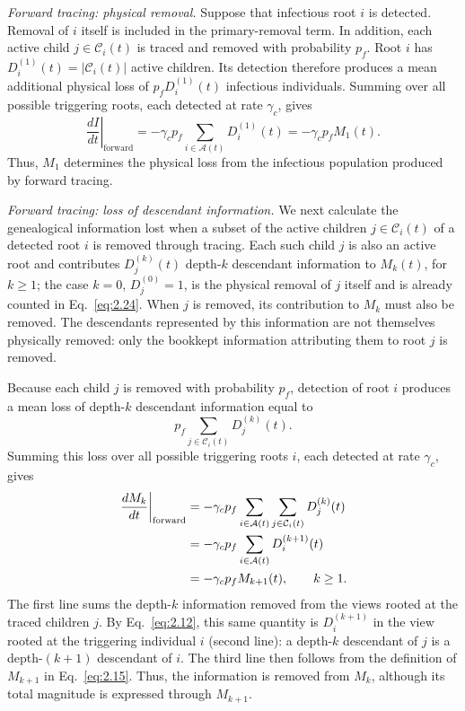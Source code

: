 \documentclass[review,12pt]{elsarticle}
\numberwithin{equation}{section}
\theoremstyle{remark}
\begin{document}
\textit{Forward tracing: physical removal.} Suppose that infectious root $i$ is detected. Removal of $i$ itself is included in the primary-removal term. In addition, each active child $j\in\mathcal C_i(t)$ is traced and removed with probability $p_f$. Root $i$ has $D_i^{(1)}(t)=|\mathcal C_i(t)|$ active children. Its detection therefore produces a mean additional physical loss of $p_f D_i^{(1)}(t)$ infectious individuals. Summing over all possible triggering roots, each detected at rate $\gamma_c$, gives
\begin{equation}
\left.\frac{dI}{dt}\right|_{\text{forward}} = -\gamma_c p_f \sum_{i\in\mathcal A(t)} D_i^{(1)}(t) = -\gamma_c p_f M_1(t).
\label{eq:2.24}
\end{equation}
Thus, $M_1$ determines the physical loss from the infectious population produced by forward tracing.

\textit{Forward tracing: loss of descendant information.} We next calculate the genealogical information lost when a subset of the active children $j\in\mathcal C_i(t)$ of a detected root $i$ is removed through tracing. Each such child $j$ is also an active root and contributes $D_j^{(k)}(t)$ depth-$k$ descendant information to $M_k(t)$, for $k\geq1$; the case $k=0$, $D_j^{(0)}=1$, is the physical removal of $j$ itself and is already counted in Eq.~\eqref{eq:2.24}. When $j$ is removed, its contribution to $M_k$ must also be removed. The descendants represented by this information are not themselves physically removed: only the bookkept information attributing them to root $j$ is removed.

Because each child $j$ is removed with probability $p_f$, detection of root $i$ produces a mean loss of depth-$k$ descendant information equal to
\begin{equation}
p_f \sum_{j\in\mathcal C_i(t)} D_j^{(k)}(t).
\label{eq:2.25}
\end{equation}
Summing this loss over all possible triggering roots $i$, each detected at rate $\gamma_c$, gives
\begin{align}
\left.\frac{dM_k}{dt}\right|_{\text{forward}} &= -\gamma_c p_f \sum_{i\in\mathcal A(t)} \sum_{j\in\mathcal C_i(t)} D_j^{(k)}(t) \notag\\
&= -\gamma_c p_f \sum_{i\in\mathcal A(t)} D_i^{(k+1)}(t) \notag\\
&= -\gamma_c p_f M_{k+1}(t), \qquad k\geq1.
\label{eq:2.26}
\end{align}
The first line sums the depth-$k$ information removed from the views rooted at the traced children $j$. By Eq.~\eqref{eq:2.12}, this same quantity is $D_i^{(k+1)}$ in the view rooted at the triggering individual $i$ (second line): a depth-$k$ descendant of $j$ is a depth-$(k+1)$ descendant of $i$. The third line then follows from the definition of $M_{k+1}$ in Eq.~\eqref{eq:2.15}. Thus, the information is removed from $M_k$, although its total magnitude is expressed through $M_{k+1}$.
\end{document}
